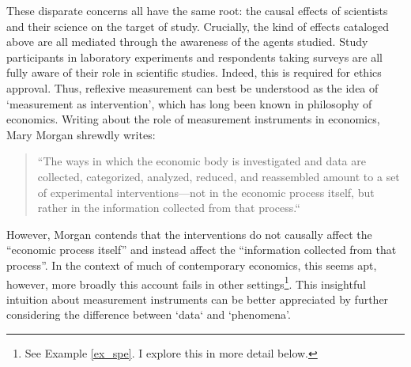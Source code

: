 These disparate concerns all have the same root: the causal effects of scientists and their science on the target of study. Crucially, the kind of effects cataloged above are all mediated through the awareness of the agents studied. Study participants in laboratory experiments and respondents taking surveys are all fully aware of their role in scientific studies. Indeed, this is required for ethics approval. Thus, reflexive measurement can best be understood as the idea of `measurement as intervention', which has long been known in philosophy of economics. Writing about the role of measurement instruments in economics, Mary Morgan shrewdly writes:
\begin{quote}     
    ``The ways in which the economic body is investigated and data are collected, categorized, analyzed, reduced, and reassembled amount to a set of experimental interventions---not in the economic process itself, but rather in the information collected from that process.`` \autocite[p237]{morgan2001}
\end{quote}
\noindent However, Morgan contends that the interventions do not causally affect the ``economic process itself'' and instead affect the ``information collected from that process''. In the context of much of contemporary economics, this seems apt, however, more broadly this account fails in other settings\footnote{See Example \ref{ex_spe}. I explore this in more detail below.}. This insightful intuition about measurement instruments can be better appreciated by further considering the difference between `data` and `phenomena'.


